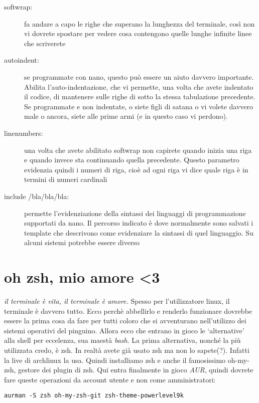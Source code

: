 \documentclass[twoside,italian]{book}
\newcommand{\code}[1]{\texttt{#1}}
\newcommand{\centcode}[1]{

\definecolor{codice}{rgb}{0.5,0.1,0.1}

	\begin{center}
		\color{codice}
		\code{#1}
	\end{center}


}
\begin{document}
			\begin{description}
				
				\item[softwrap:] fa andare a capo le righe che superano la lunghezza del terminale, così non vi dovrete spostare per vedere cosa contengono quelle lunghe infinite linee che scriverete
				
				\item[autoindent:] se programmate con nano, questo può essere un aiuto davvero importante. Abilita l'auto-indentazione, che vi permette, una volta che avete indentato il codice, di mantenere sulle righe di sotto la stessa tabulazione precedente. Se programmate e non indentate, o siete figli di satana o vi volete davvero male o ancora, siete alle prime armi (e in questo caso vi perdono).
				
				\item [linenumbers:] una volta che avete abilitato softwrap non capirete quando inizia una riga e quando invece sta continuando quella precedente. Questo parametro evidenzia quindi i numeri di riga, cioè ad ogni riga vi dice quale riga è in termini di numeri cardinali
				
				\item[include /bla/bla/bla:] permette l'evidenziazione della sintassi dei linguaggi di programmazione supportati da nano. Il percorso indicato è dove normalmente sono salvati i template che descrivono come evidenziare la sintassi di quel linguaggio. Su alcuni sistemi potrebbe essere diverso
			\end{description}
		
		\section{oh zsh, mio amore <3}
			
			\textit{il terminale è vita, il terminale è amore.} Spesso per l'utilizzatore linux, il terminale è davvero tutto. Ecco perchè abbellirlo e renderlo funzionare dovrebbe essere la prima cosa da fare per tutti coloro che si avventurano nell'utilizzo dei sistemi operativi del pinguino. Allora ecco che entrano in gioco le `alternative' alla shell per eccelenza, sua maestà \textit{bash}.
			La prima alternativa, nonché la più utilizzata credo, è zsh. In realtà avete già usato zsh ma non lo sapete(?). Infatti la live di archlinux la usa.
			Quindi installiamo zsh e anche il famosissimo oh-my-zsh, gestore dei plugin di zsh.
			Qui entra finalmente in gioco \textit{AUR}, quindi dovrete fare queste operazioni da account utente e non come amministratori:
			\centcode{aurman -S zsh oh-my-zsh-git zsh-theme-powerlevel9k}
			
\end{document}
